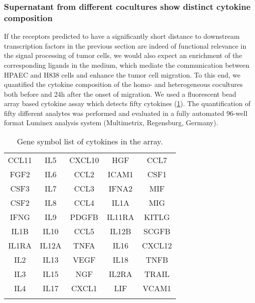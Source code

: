 \subsubsection{Supernatant  from different cocultures show distinct cytokine composition}

If the receptors predicted to have a significantly short
distance to downstream transcription factors in the previous section are indeed of functional
relevance in the signal processing of tumor cells, we would also expect an
enrichment of the corresponding ligands in the medium,
which mediate the communication between
HPAEC and H838 cells and enhance the tumor cell migration.
To this end, we quantified the cytokine composition
of the  homo- and heterogeneous cocultures
both before and 24h after the onset of migration.
We used a  fluorescent bead array based cytokine assay which detects fifty cytokines (\ref{table:cytokine}).
The quantification of fifty different analytes was performed and evaluated in a  fully automated 96-well format Luminex analysis system (Multimetrix, Regensburg,  Germany). 

\clearpage
\begin{longtable}{ccccc}
\caption{Gene symbol list of cytokines in the array.} \\ 
\hline
CCL11 & IL5 &   CXCL10 &  HGF & CCL7\\
\rowcolor{Gray} FGF2 &  IL6 &   CCL2 &  ICAM1 & CSF1\\
CSF3 &  IL7 &   CCL3 & IFNA2 & MIF\\
\rowcolor{Gray} CSF2 & IL8 &   CCL4 &  IL1A & MIG\\
IFNG &  IL9&    PDGFB&  IL11RA & KITLG\\
\rowcolor{Gray} IL1B &  IL10 &  CCL5 & IL12B  & SCGFB\\
IL1RA &  IL12A  &  TNFA &   IL16 &  CXCL12\\
\rowcolor{Gray} IL2 &   IL13 &  VEGF &   IL18 &  TNFB\\
IL3 &   IL15 &  NGF&  IL2RA &   TRAIL\\
\rowcolor{Gray} IL4 &   IL17 &  CXCL1 &  LIF &VCAM1\\
\hline
\label{table:cytokine}
\end{longtable}
\newpage

